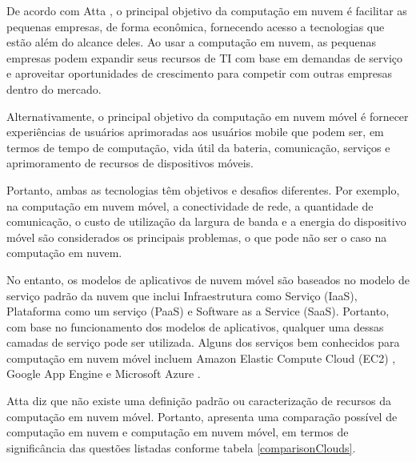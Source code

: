 \documentclass[12pt]{article}
\begin{document}
De acordo com Atta \cite{atta2013}, o principal objetivo da computação em nuvem é facilitar as pequenas empresas,
de forma econômica, fornecendo acesso a tecnologias que estão além do alcance deles. Ao usar a computação em nuvem,
as pequenas empresas podem expandir seus recursos de TI com base em demandas de serviço e aproveitar oportunidades
de crescimento para competir com outras empresas dentro do mercado.

Alternativamente, o principal objetivo da computação em nuvem móvel é fornecer experiências de usuários aprimoradas
aos usuários mobile que podem ser, em termos de tempo de computação, vida útil da bateria, comunicação, serviços e
aprimoramento de recursos de dispositivos móveis.

Portanto, ambas as tecnologias têm objetivos e desafios diferentes. Por exemplo, na computação em nuvem móvel,
a conectividade de rede, a quantidade de comunicação, o custo de utilização da largura de banda e a energia do
dispositivo móvel são considerados os principais problemas, o que pode não ser o caso na computação em nuvem.

No entanto, os modelos de aplicativos de nuvem móvel são baseados no modelo de serviço padrão da nuvem que inclui
Infraestrutura como Serviço (IaaS), Plataforma como um serviço (PaaS) e Software as a Service (SaaS). Portanto,
com base no funcionamento dos modelos de aplicativos, qualquer uma dessas camadas de serviço pode ser utilizada.
Alguns dos serviços bem conhecidos para computação em nuvem móvel incluem Amazon Elastic Compute Cloud (EC2) \cite{amazon},
Google App Engine \cite{googleapp} e Microsoft Azure \cite{azure}.

Atta \cite{atta2013} diz que não existe uma definição padrão ou caracterização de recursos da computação em nuvem móvel.
Portanto, apresenta uma comparação possível de computação em nuvem e computação em nuvem móvel, em termos de significância
das questões listadas conforme tabela \ref{comparisonClouds}.
\end{document}
